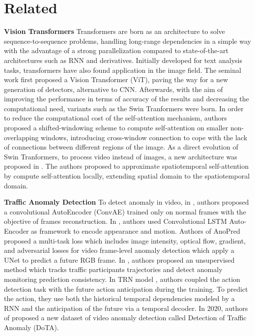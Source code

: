 \section{Related}
\label{sec:related}

\noindent\textbf{Vision Transformers}
Transformers \cite{vaswani2017attention} are born as an architecture to solve sequence-to-sequence problems, handling long-range dependencies in a simple way with the advantage of a strong parallelization compared to state-of-the-art architectures such as RNN and derivatives.
Initially developed for text analysis tasks, transformers have also found application in the image field.
The seminal work \cite{DBLP:conf/iclr/DosovitskiyB0WZ21} first proposed a Vision Transformer (ViT), paving the way for a new generation of detectors, alternative to CNN.
Afterwards, with the aim of improving the performance in terms of accuracy of the results and decreasing the computational need, variants such as the Swin Tranformers \cite{liu2021Swin} were born.
In order to reduce the computational cost of the self-attention mechanism, authors proposed a shifted-windowing scheme to compute self-attention on smaller non-overlapping windows, introducing cross-window connection to cope with the lack of connections between different regions of the image.
As a direct evolution of Swin Tranformers, to process video instead of images, a new architecture was proposed in \cite{liu_video_2022}.
The authors proposed to approximate spatiotemporal self-attention by compute self-attention locally, extending spatial domain to the spatiotemporal domain.

\noindent\textbf{Traffic Anomaly Detection}
To detect anomaly in video, in \cite{hasan2016learning}, authors proposed a convolutional AutoEncoder (ConvAE) trained only on normal frames with the objective of frames reconstruction.
In \cite{luo2017remembering, wang2018abnormal}, authors used Convolutional LSTM Auto-Encoder as framework to encode appearance and motion.
Authors of AnoPred \cite{liu2018future} proposed a multi-task loss which includes image intensity, optical flow, gradient, and adversarial losses for video frame-level anomaly detection which apply a UNet to predict a future RGB frame.
In \cite{yao2019unsupervised}, authors proposed an unsupervised method which tracks traffic participants trajectories and detect anomaly monitoring prediction consistency.
In TRN model \cite{xu2019temporal}, authors coupled the action detection task with the future action anticipation during the training.
To predict the action, they use both the historical temporal dependencies modeled by a RNN and the anticipation of the future via a temporal decoder.
In 2020, authors of \cite{9712446} proposed a new dataset of video anomaly detection called Detection of Traffic Anomaly (DoTA).

